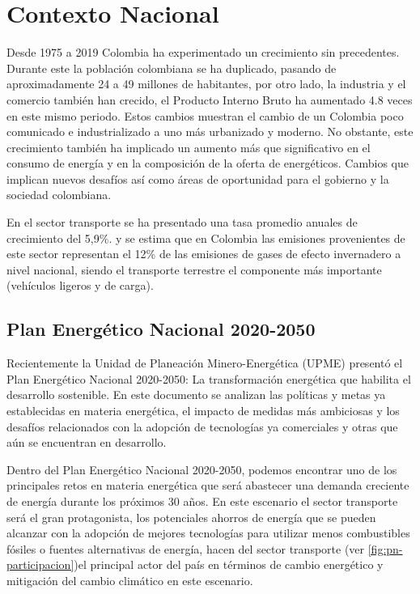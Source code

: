 \chapter{Contexto Nacional}

Desde 1975 a 2019 Colombia ha experimentado un crecimiento sin precedentes. Durante este la población colombiana se ha duplicado, pasando de aproximadamente 24 a 49 millones de habitantes, por otro lado, la industria y el comercio también han crecido, el Producto Interno Bruto ha aumentado 4.8 veces en este mismo periodo. Estos cambios muestran el cambio de un Colombia poco comunicado e industrializado a uno más urbanizado y moderno. \cite{Plan_Energetico-2050} No obstante, este crecimiento también ha implicado un aumento más que significativo en el consumo de energía y en la composición de la oferta de energéticos. Cambios que implican nuevos desafíos así como áreas de oportunidad para el gobierno y la sociedad colombiana. 

En el sector transporte se ha presentado una tasa promedio anuales de crecimiento del  5,9\%. \cite{Plan_Energetico-2050} y se estima que en Colombia las emisiones provenientes de este sector representan el 12\% de las emisiones de gases de efecto invernadero a nivel nacional, siendo el transporte terrestre el componente más importante (vehículos ligeros y de carga). \cite{IDEAM_CO}

\section{Plan Energético Nacional 2020-2050}

Recientemente la Unidad de Planeación Minero-Energética (UPME) presentó el Plan Energético Nacional 2020-2050: La transformación energética que habilita el desarrollo sostenible. En este documento se analizan las políticas y metas ya establecidas en materia energética, el impacto de medidas más ambiciosas y los desafíos relacionados con la adopción de tecnologías ya comerciales y otras que aún se encuentran en desarrollo.

Dentro del Plan Energético Nacional 2020-2050, podemos encontrar uno de los principales retos en materia energética que será abastecer una demanda creciente de energía durante los próximos 30 años. En este escenario el sector transporte será el gran protagonista, los potenciales ahorros de energía que se pueden alcanzar con la adopción de mejores tecnologías para utilizar menos combustibles fósiles o fuentes alternativas de energía, hacen del sector transporte (ver \ref{fig:pn-participacion})el principal actor del país en términos de cambio energético y mitigación del cambio climático en este escenario. \cite{Plan_Energetico-2050}

